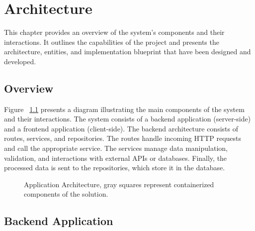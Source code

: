 %
%
\chapter{Architecture} \label{cap:architecture}

This chapter provides an overview of the system’s components and their interactions.
It outlines the capabilities of the project and presents the architecture, entities, and
implementation blueprint that have been designed and developed.

\section{Overview}

Figure ~\ref{fig:architecture} presents a diagram illustrating the main components of the system and their interactions. The system consists of a backend application (server-side) and a frontend application (client-side).
The backend architecture consists of routes, services, and repositories. The routes handle incoming HTTP requests and call the appropriate service. The services manage data manipulation, validation, and interactions with external APIs or databases. Finally, the processed data is sent to the repositories, which store it in the database.

\begin{figure}[H]
	\begin{center}
	\end{center}
	\caption{Application Architecture, gray squares represent containerized components of the solution.}\label{fig:architecture}
\end{figure}

\section{Backend Application}

